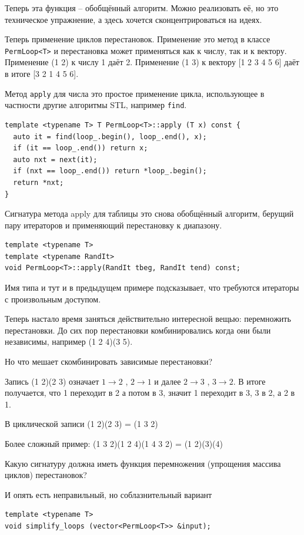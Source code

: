 \documentclass[a4paper,12pt,oneside]{book}
\begin{document}
Теперь эта функция -- обобщённый алгоритм. Можно реализовать её, но это техническое упражнение, а здесь хочется сконцентрироваться на идеях.

Теперь применение циклов перестановок. Применение это метод в классе \lstinline!PermLoop<T>! и перестановка может применяться как к числу, так и к вектору. Применение (1 2) к числу 1 даёт 2. Применение (1 3) к вектору [1 2 3 4 5 6] даёт в итоге [3 2 1 4 5 6].

Метод \lstinline!apply! для числа это простое применение цикла, использующее в частности другие алгоритмы STL, например \lstinline!find!.

\begin{lstlisting}
template <typename T> T PermLoop<T>::apply (T x) const {
  auto it = find(loop_.begin(), loop_.end(), x);
  if (it == loop_.end()) return x;
  auto nxt = next(it);
  if (nxt == loop_.end()) return *loop_.begin();
  return *nxt;
}
\end{lstlisting}

Сигнатура метода apply для таблицы это снова обобщённый алгоритм, берущий пару итераторов и применяющий перестановку к диапазону.

\begin{lstlisting}
template <typename T>
template <typename RandIt>
void PermLoop<T>::apply(RandIt tbeg, RandIt tend) const;
\end{lstlisting}

Имя типа и тут и в предыдущем примере подсказывает, что требуются итераторы с произвольным доступом.

Теперь настало время заняться действительно интересной вещью: перемножить перестановки. До сих пор перестановки комбинировались когда они были независимы, например (1 2 4)(3 5).

Но что мешает скомбинировать зависимые перестановки?

Запись (1 2)(2 3) означает $1 \rightarrow 2$ , $2 \rightarrow 1$ и далее $2 \rightarrow 3$ , $3 \rightarrow 2$. В итоге получается, что 1 переходит в 2 а потом в 3, значит 1 переходит в 3, 3 в 2, а 2 в 1.

В циклической записи (1 2)(2 3) = (1 3 2)

Более сложный пример: (1 3 2)(1 2 4)(1 4 3 2) = (1 2)(3)(4)

Какую сигнатуру должна иметь функция перемножения (упрощения массива циклов) перестановок?

И опять есть неправильный, но соблазнительный вариант

\begin{lstlisting}
template <typename T>
void simplify_loops (vector<PermLoop<T>> &input);
\end{lstlisting}
\end{document}
